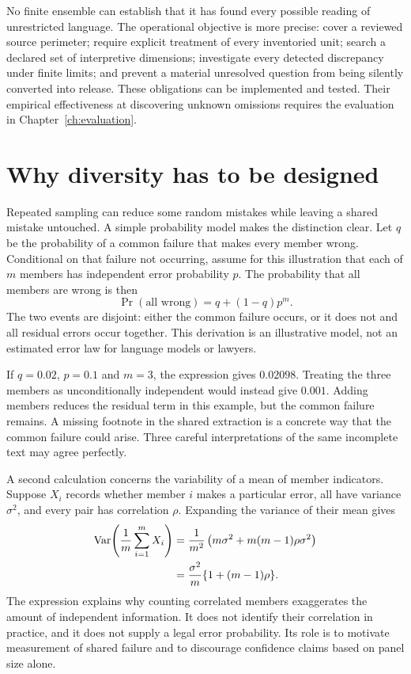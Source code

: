\documentclass[12pt,a4paper,oneside,openany]{book}
\begin{document}
No finite ensemble can establish that it has found every possible reading of
unrestricted language. The operational objective is more precise: cover a
reviewed source perimeter; require explicit treatment of every inventoried unit;
search a declared set of interpretive dimensions; investigate every detected
discrepancy under finite limits; and prevent a material unresolved question from
being silently converted into release. These obligations can be implemented and
tested. Their empirical effectiveness at discovering unknown omissions requires
the evaluation in Chapter~\ref{ch:evaluation}.

\section{Why diversity has to be designed}
\label{merge:M06:01}


Repeated sampling can reduce some random mistakes while leaving a shared mistake
untouched. A simple probability model makes the distinction clear. Let $q$ be the
probability of a common failure that makes every member wrong. Conditional on
that failure not occurring, assume for this illustration that each of $m$ members
has independent error probability $p$. The probability that all members are wrong
is then
\begin{equation}
 \Pr(\text{all wrong})=q+(1-q)p^m.
 \label{eq:common-error}
\end{equation}
The two events are disjoint: either the common failure occurs, or it does not and
all residual errors occur together. This derivation is an illustrative model,
not an estimated error law for language models or lawyers.

If $q=0.02$, $p=0.1$ and $m=3$, the expression gives $0.02098$. Treating the three
members as unconditionally independent would instead give $0.001$. Adding
members reduces the residual term in this example, but the common failure
remains. A missing footnote in the shared extraction is a concrete way that the
common failure could arise. Three careful interpretations of the same incomplete
text may agree perfectly.

A second calculation concerns the variability of a mean of member indicators.
Suppose $X_i$ records whether member $i$ makes a particular error, all have variance
$\sigma^2$, and every pair has correlation $\rho$. Expanding the variance of their
mean gives
\begin{align}
 \operatorname{Var}\!\left(\frac1m\sum_{i=1}^m X_i\right)
 &=\frac{1}{m^2}\left(m\sigma^2+m(m-1)\rho\sigma^2\right)\notag\\
 &=\frac{\sigma^2}{m}\{1+(m-1)\rho\}.
 \label{eq:ensemble-variance}
\end{align}
The expression explains why counting correlated members exaggerates the amount
of independent information. It does not identify their correlation in practice,
and it does not supply a legal error probability. Its role is to motivate
measurement of shared failure and to discourage confidence claims based on panel
size alone.
\end{document}
